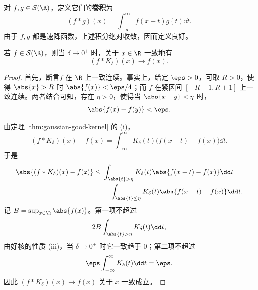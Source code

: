 \begin{definition}
对 \(f,g\in\mathcal S(\R)\)，定义它们的\textbf{卷积}为
\[
(f*g)(x)
=\int_{-\infty}^{\infty}f(x-t)g(t)\dd t.
\]
由于 \(f,g\) 都是速降函数，上述积分绝对收敛，因而定义良好。
\end{definition}

\begin{proposition}\label{prop:gaussian-approximate-identity}
若 \(f\in\mathcal S(\R)\)，则当 \(\delta\to0^+\) 时，关于 \(x\in\R\) 一致地有
\[
(f*K_\delta)(x)\longrightarrow f(x).
\]
\end{proposition}

\begin{proof}
首先，断言\(f\) 在 \(\R\) 上一致连续。事实上，给定 \(\eps>0\)，可取 \(R>0\)，使得 \(\abs{x}>R\) 时 \(\abs{f(x)}<\eps/4\)；而 \(f\) 在紧区间 \([-R-1,R+1]\) 上一致连续。两者结合可知，存在 \(\eta>0\)，使得当 \(\abs{x-y}<\eta\) 时，
\[
\abs{f(x)-f(y)}<\eps.
\]

由定理 \ref{thm:gaussian-good-kernel} 的 (i)，
\[
(f*K_\delta)(x)-f(x)
=\int_{-\infty}^{\infty}K_\delta(t)
\bigl(f(x-t)-f(x)\bigr)\dd t.
\]
于是
\[
\begin{aligned}
\abs{(f*K_\delta)(x)-f(x)}
\leq{}&\int_{\abs{t}>\eta}K_\delta(t)
\abs{f(x-t)-f(x)}\dd t\\
&+\int_{\abs{t}\leq\eta}K_\delta(t)
\abs{f(x-t)-f(x)}\dd t.
\end{aligned}
\]
记 \(B=\sup_{x\in\R}\abs{f(x)}\)。第一项不超过
\[
2B\int_{\abs{t}>\eta}K_\delta(t)\dd t,
\]
由好核的性质 (iii)，当 \(\delta\to0^+\) 时它一致趋于 \(0\)；第二项不超过
\[
\eps\int_{-\infty}^{\infty}K_\delta(t)\dd t=\eps.
\]
因此 \((f*K_\delta)(x)\to f(x)\) 关于 \(x\) 一致成立。
\end{proof}
